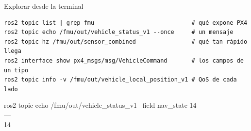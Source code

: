 \begin{frame}[fragile]{Explorar desde la terminal}
  \begin{lstlisting}[style=bash,caption={Con el agente y PX4 corriendo}]
ros2 topic list | grep fmu                            # qué expone PX4
ros2 topic echo /fmu/out/vehicle_status_v1 --once     # un mensaje
ros2 topic hz /fmu/out/sensor_combined                # qué tan rápido llega
ros2 interface show px4_msgs/msg/VehicleCommand       # los campos de un tipo
ros2 topic info -v /fmu/out/vehicle_local_position_v1 # QoS de cada lado
  \end{lstlisting}
  \begin{terminal}{ros2 topic echo /fmu/out/vehicle\_status\_v1 --field nav\_state}
14\\
---\\
14
  \end{terminal}
\end{frame}
